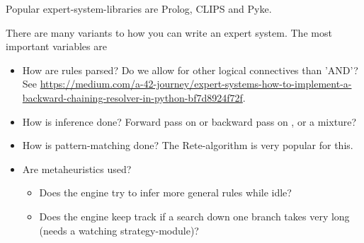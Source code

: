 Popular expert-system-libraries are Prolog, CLIPS and Pyke.

There are many variants to how you can write an expert system. 
The most important variables are 
\begin{itemize}
	\item How are rules parsed? Do we allow for other logical connectives than 'AND'? See \href{this example}{https://medium.com/a-42-journey/expert-systems-how-to-implement-a-backward-chaining-resolver-in-python-bf7d8924f72f}.
	\item How is inference done? Forward pass on  or backward pass on , or a mixture? 
	\item How is pattern-matching done? The Rete-algorithm is very popular for this.
	\item Are metaheuristics used? 
		\begin{itemize}
			\item Does the engine try to infer more general rules while idle? 
			\item Does the engine keep track if a search down one branch takes very long (needs a watching strategy-module)?
		\end{itemize}
\end{itemize}


